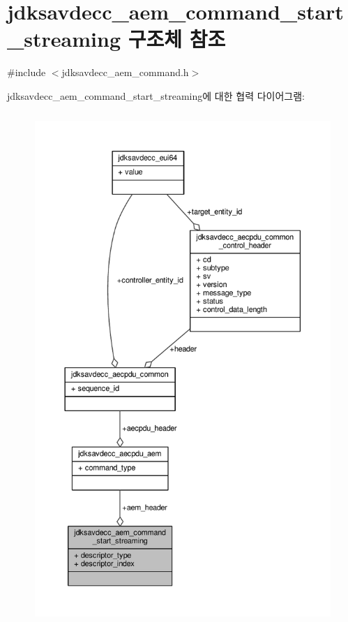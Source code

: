 \hypertarget{structjdksavdecc__aem__command__start__streaming}{}\section{jdksavdecc\+\_\+aem\+\_\+command\+\_\+start\+\_\+streaming 구조체 참조}
\label{structjdksavdecc__aem__command__start__streaming}


{\ttfamily \#include $<$jdksavdecc\+\_\+aem\+\_\+command.\+h$>$}



jdksavdecc\+\_\+aem\+\_\+command\+\_\+start\+\_\+streaming에 대한 협력 다이어그램\+:
\nopagebreak
\begin{figure}[H]
\begin{center}
\leavevmode
\includegraphics[height=550pt]{structjdksavdecc__aem__command__start__streaming__coll__graph}
\end{center}
\end{figure}
